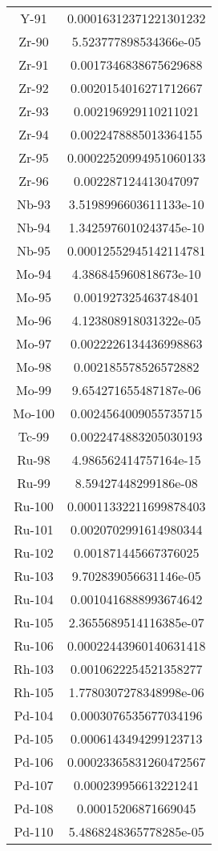 \begin{table}[h!]
\begin{tabular}{|| c || c |}
Y-91 & 0.00016312371221301232 \\
Zr-90 & 5.523777898534366e-05 \\
Zr-91 & 0.0017346838675629688 \\
Zr-92 & 0.0020154016271712667 \\
Zr-93 & 0.002196929110211021 \\
Zr-94 & 0.0022478885013364155 \\
Zr-95 & 0.00022520994951060133 \\
Zr-96 & 0.002287124413047097 \\
Nb-93 & 3.5198996603611133e-10 \\
Nb-94 & 1.3425976010243745e-10 \\
Nb-95 & 0.00012552945142114781 \\
Mo-94 & 4.386845960818673e-10 \\
Mo-95 & 0.001927325463748401 \\
Mo-96 & 4.123808918031322e-05 \\
Mo-97 & 0.0022226134436998863 \\
Mo-98 & 0.002185578526572882 \\
Mo-99 & 9.654271655487187e-06 \\
Mo-100 & 0.0024564009055735715 \\
Tc-99 & 0.0022474883205030193 \\
Ru-98 & 4.986562414757164e-15 \\
Ru-99 & 8.59427448299186e-08 \\
Ru-100 & 0.00011332211699878403 \\
Ru-101 & 0.0020702991614980344 \\
Ru-102 & 0.001871445667376025 \\
Ru-103 & 9.702839056631146e-05 \\
Ru-104 & 0.0010416888993674642 \\
Ru-105 & 2.3655689514116385e-07 \\
Ru-106 & 0.00022443960140631418 \\
Rh-103 & 0.0010622254521358277 \\
Rh-105 & 1.7780307278348998e-06 \\
Pd-104 & 0.0003076535677034196 \\
Pd-105 & 0.0006143494299123713 \\
Pd-106 & 0.00023365831260472567 \\
Pd-107 & 0.000239956613221241 \\
Pd-108 & 0.00015206871669045 \\
Pd-110 & 5.4868248365778285e-05 \\

\end{tabular}
\end{table}
